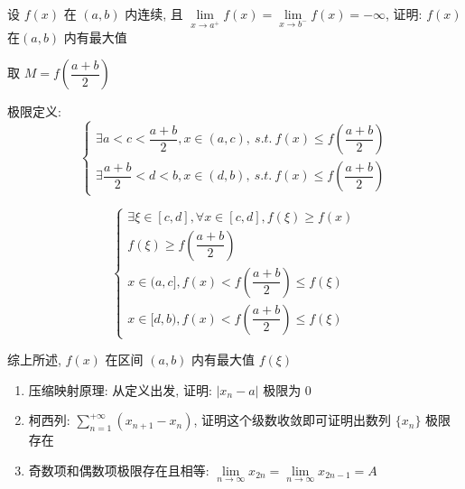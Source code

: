 \begin{proposition}
	设 $f(x)$ 在 $(a,b)$ 内连续, 且 $\lim\limits_{x\to a^{+}}f(x)=\lim\limits_{x\to b^{-}}f(x)=-\infty$, 证明: $f(x)$在$(a,b)$ 内有最大值
\end{proposition}
\begin{solution}
	
	取 $M=f(\dfrac{a+b}{2})$
	
	极限定义:  
	$$\begin{cases}
		\exists a < c < \dfrac{a+b}{2},x\in(a,c),\ s.t.\ f(x)\leq f(\dfrac{a+b}{2})\\
		\exists \dfrac{a+b}{2} < d < b,x\in(d,b),\ s.t.\ f(x)\leq f(\dfrac{a+b}{2})
	\end{cases}$$
	
	$$\begin{cases}
		\exists \xi\in [c,d], \forall x\in [c,d], f(\xi)\geq f(x)\\
		f(\xi) \geq f(\dfrac{a+b}{2})\\
		x\in (a,c], f(x) < f(\dfrac{a+b}{2}) \leq f(\xi)\\
		x\in [d,b), f(x) < f(\dfrac{a+b}{2}) \leq f(\xi)
	\end{cases}$$
	
	综上所述, $f(x)$ 在区间 $(a,b)$ 内有最大值 $f(\xi)$
\end{solution}

\begin{lemma}[不单调数列极限]
\begin{enumerate}
	\item 压缩映射原理: 从定义出发, 证明: $|x_{n}-a|$ 极限为 $0$
	\item 柯西列: $\sum\limits_{n=1}^{+\infty}(x_{n+1}-x_{n})$, 证明这个级数收敛即可证明出数列 $\{x_{n}\}$ 极限存在
	\item 奇数项和偶数项极限存在且相等: $\lim\limits_{n\to\infty}x_{2n}=\lim\limits_{n\to\infty}x_{2n-1}=A$
\end{enumerate} 
\end{lemma}

